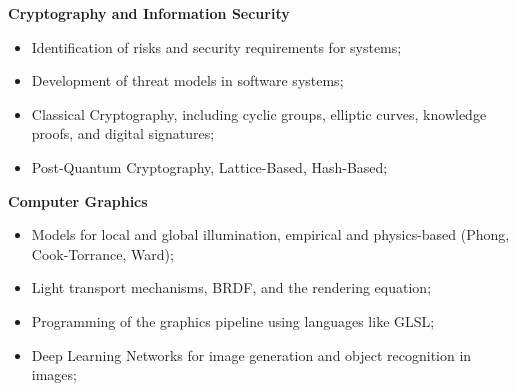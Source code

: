 \documentclass[9pt,a4paper]{altacv}
\begin{document}
\begin{fullwidth}

\medskip




\smallskip
\textbf{
Cryptography and Information Security}
\normalsize\par
\smallskip

\begin{itemize}
    \item Identification of risks and security requirements for systems;
    \item Development of threat models in software systems;
    \item Classical Cryptography, including cyclic groups, elliptic curves, knowledge proofs, and digital signatures;
    \item Post-Quantum Cryptography, Lattice-Based, Hash-Based;
\end{itemize}

\textbf{Computer Graphics}
\normalsize\par
\smallskip

\begin{itemize}
    \item Models for local and global illumination, empirical and physics-based (Phong, Cook-Torrance, Ward);
    \item Light transport mechanisms, BRDF, and the rendering equation;
    \item Programming of the graphics pipeline using languages like GLSL;
    \item Deep Learning Networks for image generation and object recognition in images;
\end{itemize}


\end{fullwidth}
\end{document}
